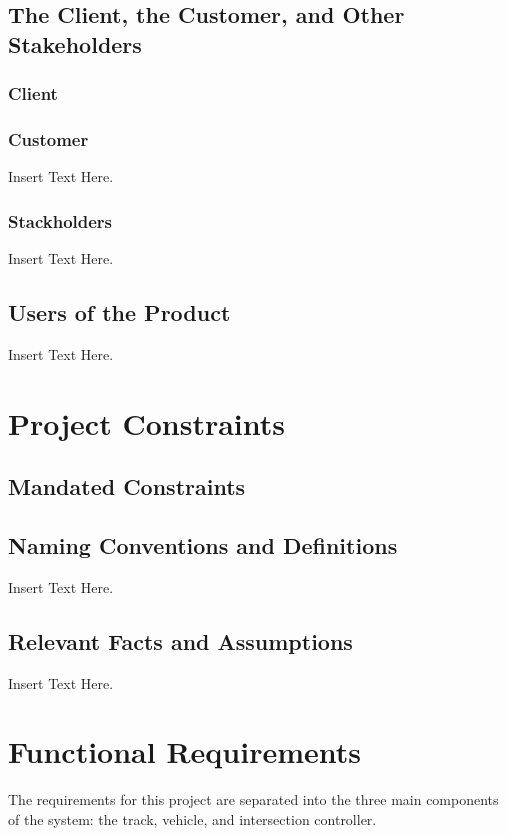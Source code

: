 \documentclass [12pt]{article}
\begin{document}
\subsection{The Client, the Customer, and Other Stakeholders}

\subsubsection{Client}
\lipsum[1]  %

\subsubsection{Customer}
 Insert Text Here.

\subsubsection{Stackholders}
 Insert Text Here.

\subsection{Users of the Product} 
Insert Text Here.\\


\section{\textbf{Project Constraints}}


\subsection{Mandated Constraints}
\lipsum[1]  %
\subsection{Naming Conventions and Definitions}
	Insert Text Here.
	
\subsection{Relevant Facts and Assumptions} 
	Insert Text Here.



\section {Functional Requirements} 
The requirements for this project are separated into the three main components of the system: the track, vehicle, and intersection controller.
\end{document}
